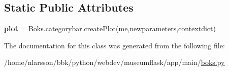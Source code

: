 \subsection*{Static Public Attributes}
\begin{DoxyCompactItemize}
\item 
\mbox{\label{classapp_1_1main_1_1boks_1_1Boks_1_1that__opened__up__to__a__given__time_aed54e5137afe5da4af18fa25bde4b7c1}} 
{\bfseries plot} = Boks.\+categorybar.\+create\+Plot(me,newparameters,contextdict)
\end{DoxyCompactItemize}


The documentation for this class was generated from the following file\+:\begin{DoxyCompactItemize}
\item 
/home/nlarsson/bbk/python/webdev/museumflask/app/main/\mbox{\hyperlink{boks_8py}{boks.\+py}}\end{DoxyCompactItemize}
